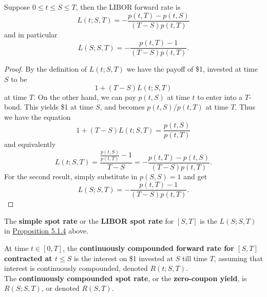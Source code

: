 \documentclass[11pt,fleqn]{book} %
\begin{document}
\begin{proposition} \label{proposition:514}
Suppose \(0 \leq t \leq S \leq T\), then the LIBOR forward rate is
\[
L(t; S, T) = -\frac{p(t, T) - p(t, S)}{(T - S)p(t, T)}
\]
and in particular
\[
L(S; S, T) = -\frac{p(t, T) - 1}{(T - S)p(t, T)}.
\]
\end{proposition}
\begin{proof}
By the definition of \(L(t; S, T)\) we have the payoff of \$1, invested at time \(S\) to be
\[
1 + (T - S)L(t; S, T)
\]
at time \(T\). On the other hand, we can pay \(p(t, S)\) at time \(t\) to enter into a \(T\)-bond. This yields \$1 at time \(S\), and becomes \(p(t, S) / p(t, T)\) at time \(T\). Thus we have the equation
\[
1 + (T - S)L(t; S, T) = \frac{p(t, S)}{p(t, T)}
\]
and equivalently
\[
L(t; S, T) = \frac{\frac{p(t, S)}{p(t, T)} - 1}{T - S} = -\frac{p(t, T) - p(t, S)}{(T - S)p(t, T)}.
\]
\indent For the second result, simply substitute in \(p(S, S) = 1\) and get
\[
L(S; S, T) = -\frac{p(t, T) - 1}{(T - S)p(t, T)}.
\]
\end{proof}

\begin{definition} \label{def:515}
The \textbf{simple spot rate} or the \textbf{LIBOR spot rate} for \([S, T]\) is the \(L(S; S, T)\) in \hyperref[proposition:514]{Proposition 5.1.4} above.
\end{definition}

\begin{definition} \label{prop:516}
At time \(t \in [0, T]\), the \textbf{continuously compounded forward rate for \([S, T]\) contracted at \(t \leq S\)} is the interest on \$1 invested at \(S\) till time \(T\), assuming that interest is continuously compounded, denoted \(R(t; S, T)\). \\
\indent The \textbf{continuously compounded spot rate}, or the \textbf{zero-coupon yield}, is \(R(S; S, T)\), or denoted \(R(S, T)\).
\end{definition}
\end{document}
